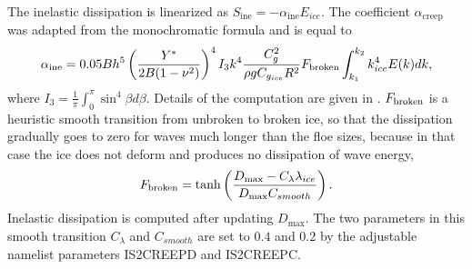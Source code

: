 The inelastic dissipation is linearized as  $S_{\mathrm{ine}}=-\alpha_{\mathrm{ine}} E_{ice}$. 
The coefficient $\alpha_{\mathrm{creep}}$ was adapted from the 
\cite{art:Wad73} monochromatic formula and is equal to
\begin{equation}
\alpha_{\mathrm{ine}}=0.05 B h^5 \left(\frac{Y^*}{2B(1-\nu^2)}\right)^{4} I_3 k^4 \frac{C_g^2}{\rho g C_{g_{ice}}R^2} F_{\rm broken} \int_{k_1}^{k_2} k_{ice}^4 E(k)dk, 
\label{eq:alpha_creep}
\end{equation}
where $I_3=\frac{1}{\pi} \int_0^\pi \sin^{4}\beta d\beta$. Details of the computation are given in \cite{art:Bea18}.
$F_{\rm broken}$  is a heuristic smooth transition from unbroken to broken ice, so that the dissipation 
gradually goes to zero for waves much longer than the floe sizes, because in that case the ice does 
not deform and produces no dissipation of wave energy, 
\begin{equation}
F_{\rm broken}=\tanh \left( {\frac{D_{\max}-C_{\lambda}\lambda_{ice}} {D_{\max}C_{smooth} } }\right) .
\label{smooth}
\end{equation}
Inelastic dissipation is computed after updating $D_{\max}$. 
The two parameters in this smooth transition $C_{\lambda}$ and $C_{smooth}$ are 
set to  $0.4$ and $0.2$ by the adjustable namelist parameters {\code IS2CREEPD} and {\code IS2CREEPC}.\\

